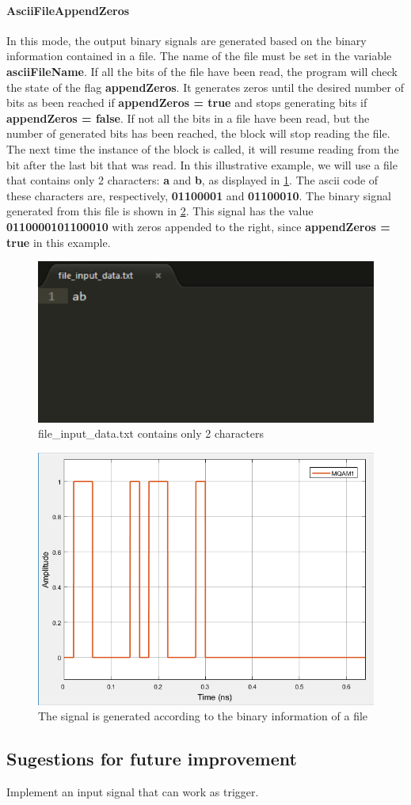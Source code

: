\paragraph{AsciiFileAppendZeros}
In this mode, the output binary signals are generated based on the binary information contained in a file. The name of the file must be set in the variable \textbf{asciiFileName}. If all the bits of the file have been read, the program will check the state of the flag \textbf{appendZeros}. It generates zeros until the desired number of bits as been reached if \textbf{appendZeros = true} and stops generating bits if \textbf{appendZeros = false}.
If not all the bits in a file have been read, but the number of generated bits has been reached, the block will stop reading the file. The next time the instance of the block is called, it will resume reading from the bit after the last bit that was read.
In this illustrative example, we will use a file that contains only 2 characters: \textbf{a} and \textbf{b}, as displayed in \ref{fig:asciifileexample}. The ascii code of these characters are, respectively, \textbf{01100001} and \textbf{01100010}. The binary signal generated from this file is shown in \ref{fig:generatedsignalfile}. This signal has the value \textbf{0110000101100010} with zeros appended to the right, since \textbf{appendZeros = true} in this example.
%
\begin{figure}[h]
	\centering
\includegraphics[width=.6\linewidth]{./lib/binary_source/figures/file_input_data_binary_source}
\caption{file\_input\_data.txt contains only 2 characters}\label{fig:asciifileexample}
\end{figure}
%
\begin{figure}[h]
	\centering
\includegraphics[width=.8\linewidth]{./lib/binary_source/figures/generated_signal_file}
\caption{The signal is generated according to the binary information of a file}\label{fig:generatedsignalfile}
\end{figure}
%

\subsection*{Sugestions for future improvement}

Implement an input signal that can work as trigger.

